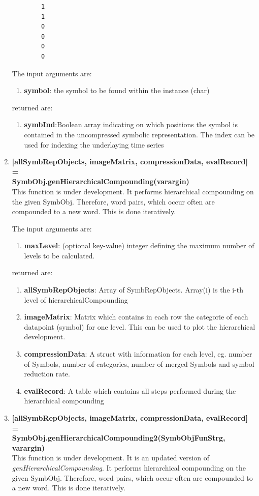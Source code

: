\documentclass[a4]{scrreprt}
\begin{document}
\begin{enumerate}
\begin{verbatim}
		1
		1
		0
		0
		0
		0
		\end{verbatim}
		
		The input arguments are:
		\begin{enumerate}
			\item \textbf{symbol}: the symbol to be found within the instance (char)
		\end{enumerate}
		returned are:
		\begin{enumerate}
			\item \textbf{symbInd}:Boolean array indicating on which positions the symbol is contained in the uncompressed symbolic representation. The index can be used for indexing the underlaying time series
		\end{enumerate}
	
	\item \textbf{[allSymbRepObjects, imageMatrix, compressionData, evalRecord] = \\SymbObj.genHierarchicalCompounding(varargin)}\\
		This function is under development. It performs hierarchical compounding on the given SymbObj. Therefore, word pairs, which occur often are compounded to a new word. This is done iteratively.
	
				The input arguments are:
		\begin{enumerate}
			\item \textbf{maxLevel}: (optional key-value) integer defining the maximum number of levels to be calculated.
		\end{enumerate}
		returned are:
		\begin{enumerate}
			\item \textbf{allSymbRepObjects}: Array of SymbRepObjects. Array(i) is the i-th level of hierarchicalCompounding
			\item \textbf{imageMatrix}: Matrix which contains in each row the categorie of each datapoint (symbol) for one level. This can be used to plot the hierarchical development.
			\item \textbf{compressionData}: A struct with information for each level, eg. number of Symbols, number of categories, number of merged Symbols and symbol reduction rate.
			\item \textbf{evalRecord}: A table which contains all steps performed during the hierarchical compounding
		\end{enumerate}

	\item \textbf{[allSymbRepObjects, imageMatrix, compressionData, evalRecord] = \\SymbObj.genHierarchicalCompounding2(SymbObjFunStrg, varargin)}\\
		This function is under development. It is an updated version of \textit{genHierarchicalCompounding}. It performs hierarchical compounding on the given SymbObj. Therefore, word pairs, which occur often are compounded to a new word. This is done iteratively.
	

\end{enumerate}
\end{document}
